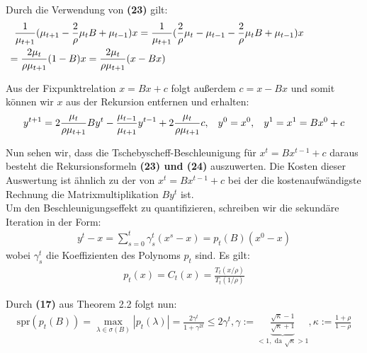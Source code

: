 \documentclass[12pt,a4paper,numbers=endperiod]{scrartcl}
\theoremstyle{definition}
\newcommand{\spr}{\text{spr}}
\begin{document}
Durch die Verwendung von \textbf{(23)} gilt:
\begin{align*}
	\frac{1}{\mu_{t+1}}(\mu_{t+1} - \frac{2}{\rho} \mu_tB + \mu_{t-1})x = \frac{1}{\mu_{t+1}}(\frac{2}{\rho} \mu_t - \mu_{t-1} - \frac{2}{\rho} \mu_tB + \mu_{t-1})x
	\hspace{19mm}\\ = \frac{2 \mu_t}{\rho \mu_{t+1}}(1-B)x = \frac{2 \mu_t}{\rho \mu_{t+1}}(x-Bx) \hspace{68mm}
\end{align*}

Aus der Fixpunktrelation $x = Bx + c$ folgt außerdem $c = x - Bx$ und somit können wir $x$ aus der Rekursion entfernen und erhalten:
\begin{gather}
	y^{t+1} = 2 \frac{\mu_t}{\rho \mu_{t+1}}By^t - \frac{\mu_{t-1}}{\mu_{t+1}} y^{t-1} + 2\frac{\mu_t}{\rho \mu_{t+1}}c, \hspace{3mm} y^0 = x^0, \hspace{3mm} y^1 = x^1 = Bx^0+c
\end{gather}

Nun sehen wir, dass die Tschebyscheff-Beschleunigung für $x^t = Bx^{t-1} + c$ daraus besteht die Rekursionsformeln \textbf{(23) und (24)} auszuwerten. Die Kosten dieser Auswertung ist ähnlich zu der von $x^t = Bx^{t-1} + c$ bei der die kostenaufwändigste Rechnung die Matrixmultiplikation $By^t$ ist.\\

Um den Beschleunigungseffekt zu quantifizieren, schreiben wir die sekundäre Iteration in der Form:
\begin{align*}
y^t - x = \sum\limits_{s=0}^t \gamma_s^t (x^s -x) = p_t(B)(x^0-x)
\end{align*}
wobei $\gamma_s^t$ die Koeffizienten des Polynoms $p_t$ sind. Es gilt:
\begin{align*}
	p_t(x) = C_t(x) = \frac{T_t(x/\rho)}{T_t(1/\rho)}
\end{align*}

Durch \textbf{(17)} aus Theorem 2.2 folgt nun:
\begin{align*}
\spr(p_t(B)) = \max\limits_{\lambda \in \sigma(B)} |p_t(\lambda)| = \frac{2 \gamma^t}{1+ \gamma^{2t}} \leq 2 \gamma^t, \gamma := \underbrace{\frac{\sqrt{\kappa} -1}{\sqrt{\kappa}+1}}_{<1, \text{ da } \sqrt{\kappa} > 1}, \kappa := \frac{1+\rho}{1-\rho}
\end{align*}
\end{document}
